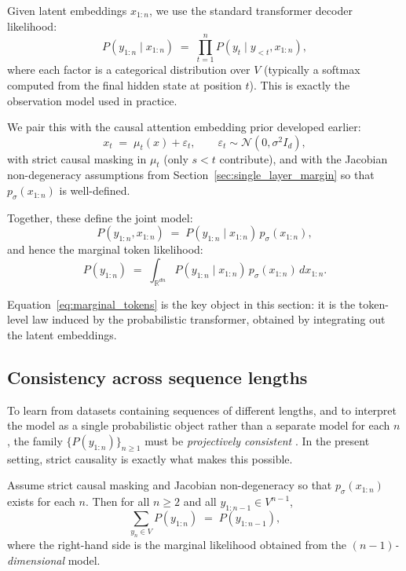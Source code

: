 \documentclass[11pt]{article}
\begin{document}
Given latent embeddings $x_{1:n}$, we use the standard transformer decoder likelihood:
\begin{equation}
P(y_{1:n}\mid x_{1:n})
\;=\;
\prod_{t=1}^n P(y_t \mid y_{<t}, x_{1:n}),
\label{eq:obs_factorization}
\end{equation}
where each factor is a categorical distribution over $V$ (typically a softmax computed from the final hidden state at position $t$). This is exactly the observation model used in practice.

We pair this with the causal attention embedding prior developed earlier:
\begin{equation}
x_t \;=\; \mu_t(x) + \varepsilon_t,
\qquad
\varepsilon_t \sim \mathcal N(0,\sigma^2 I_d),
\label{eq:state_equation_recall}
\end{equation}
with strict causal masking in $\mu_t$ (only $s<t$ contribute), and with the Jacobian non-degeneracy assumptions from Section~\ref{sec:single_layer_margin} so that $p_\sigma(x_{1:n})$ is well-defined.

Together, these define the joint model:
\begin{equation}
P(y_{1:n}, x_{1:n})
\;=\;
P(y_{1:n}\mid x_{1:n})\, p_\sigma(x_{1:n}),
\label{eq:joint_yx}
\end{equation}
and hence the marginal token likelihood:
\begin{equation}
P(y_{1:n})
\;=\;
\int_{\mathbb R^{dn}} P(y_{1:n}\mid x_{1:n})\, p_\sigma(x_{1:n}) \, dx_{1:n}.
\label{eq:marginal_tokens}
\end{equation}

Equation~\eqref{eq:marginal_tokens} is the key object in this section: it is the token-level law induced by the probabilistic transformer, obtained by integrating out the latent embeddings.

\subsection{Consistency across sequence lengths}
\label{subsec:consistency_across_lengths}

To learn from datasets containing sequences of different lengths, and to interpret the model as a single probabilistic object rather than a separate model for each $n$, the family $\{P(y_{1:n})\}_{n\ge 1}$ must be \emph{projectively consistent} \citep{Billingsley95}. In the present setting, strict causality is exactly what makes this possible.

\begin{theorem}
\label{thm:kolmogorov_consistency}
Assume strict causal masking and Jacobian non-degeneracy so that $p_\sigma(x_{1:n})$ exists for each $n$. Then for all $n\ge 2$ and all $y_{1:n-1}\in V^{n-1}$,
\begin{equation}
\sum_{y_n\in V} P(y_{1:n}) \;=\; P(y_{1:n-1}),
\label{eq:kolmogorov_consistency}
\end{equation}
where the right-hand side is the marginal likelihood obtained from the \emph{$(n-1)$-dimensional} model.
\end{theorem}
\end{document}
